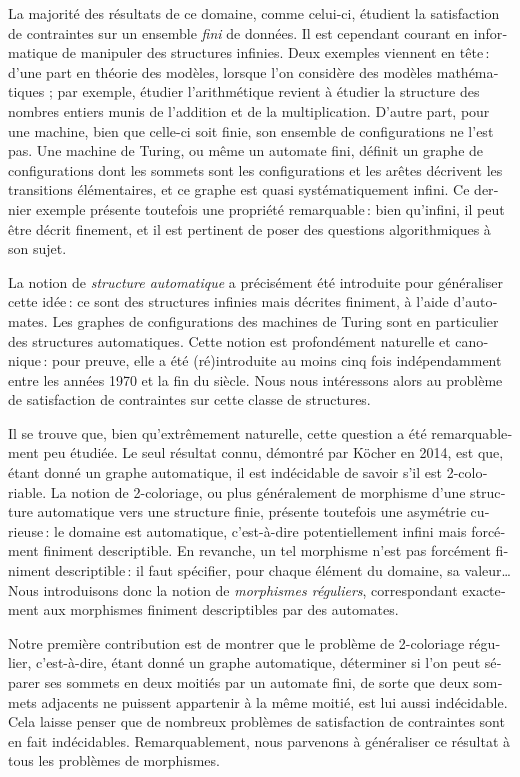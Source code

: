 \begin{french}
La majorité des résultats de ce domaine, comme celui-ci,
étudient la satisfaction de contraintes sur un ensemble \emph{fini} de données.
Il est cependant courant en informatique de manipuler des structures infinies.
Deux exemples viennent en tête : d'une part en théorie des modèles, lorsque l'on considère
des modèles mathématiques ; par exemple, étudier l'arithmétique
revient à étudier la structure des nombres entiers munis de l'addition et de la multiplication.
D'autre part, pour une machine, bien que celle-ci soit finie, son
ensemble de configurations ne l'est pas. Une machine de Turing, ou même un automate fini,
définit un graphe de configurations dont les sommets sont les configurations et
les arêtes décrivent les transitions élémentaires, et ce graphe est quasi systématiquement infini.
Ce dernier exemple présente toutefois une propriété remarquable : bien qu'infini, il peut être décrit finement, et il est pertinent de poser des questions algorithmiques à son sujet.

La notion de \emph{structure automatique} a précisément été introduite
pour généraliser cette idée : ce sont des structures infinies mais décrites
finiment, à l'aide d'automates. Les graphes de configurations des machines de Turing sont
en particulier des structures automatiques. Cette notion est profondément naturelle et
canonique : pour preuve, elle a été (ré)introduite au moins cinq fois indépendamment
entre les années 1970 et la fin du siècle. Nous nous intéressons alors au problème de satisfaction de contraintes sur cette classe de structures.

Il se trouve que, bien qu'extrêmement naturelle, cette question a été remarquablement peu
étudiée. Le seul résultat connu, démontré par Köcher en 2014, est que,
étant donné un graphe automatique, il est indécidable de savoir s'il est 2-coloriable. 
La notion de 2-coloriage, ou plus généralement de morphisme d'une structure automatique
vers une structure finie, présente toutefois une asymétrie curieuse :
le domaine est automatique, c'est-à-dire potentiellement infini mais forcément finiment
descriptible. En revanche, un tel morphisme n'est pas forcément finiment
descriptible : il faut spécifier, pour chaque élément du domaine, sa valeur…
Nous introduisons donc la notion de \emph{morphismes réguliers},
correspondant exactement aux morphismes finiment descriptibles par des automates.

Notre première contribution est de montrer que le problème de 2-coloriage régulier,
c'est-à-dire, étant donné un graphe automatique, déterminer si l'on peut séparer ses sommets
en deux moitiés par un automate fini, de sorte que deux sommets adjacents ne puissent appartenir à
la même moitié, est lui aussi indécidable.
Cela laisse penser que de nombreux problèmes de satisfaction de contraintes
sont en fait indécidables. Remarquablement, nous parvenons à généraliser ce résultat
à tous les problèmes de morphismes.


\end{french}
